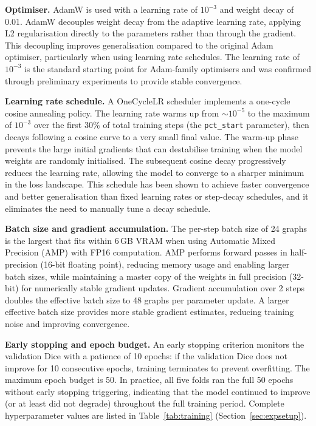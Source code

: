 \documentclass{article}
\begin{document}
\textbf{Optimiser.}
AdamW \cite{loshchilov2019adamw} is used with a learning rate of $10^{-3}$
and weight decay of 0.01. AdamW decouples weight decay from the adaptive
learning rate, applying L2 regularisation directly to the parameters rather
than through the gradient. This decoupling improves generalisation compared
to the original Adam optimiser, particularly when using learning rate
schedules. The learning rate of $10^{-3}$ is the standard starting point for
Adam-family optimisers and was confirmed through preliminary experiments to
provide stable convergence.

\textbf{Learning rate schedule.}
A OneCycleLR scheduler implements a one-cycle cosine annealing policy. The
learning rate warms up from $\sim$$10^{-5}$ to the maximum of $10^{-3}$ over
the first 30\% of total training steps (the \texttt{pct\_start} parameter),
then decays following a cosine curve to a very small final value. The warm-up
phase prevents the large initial gradients that can destabilise training when
the model weights are randomly initialised. The subsequent cosine decay
progressively reduces the learning rate, allowing the model to converge to a
sharper minimum in the loss landscape. This schedule has been shown to achieve
faster convergence and better generalisation than fixed learning rates or
step-decay schedules, and it eliminates the need to manually tune a decay
schedule.

\textbf{Batch size and gradient accumulation.}
The per-step batch size of 24 graphs is the largest that fits within 6\,GB
VRAM when using Automatic Mixed Precision (AMP) with FP16 computation. AMP
performs forward passes in half-precision (16-bit floating point), reducing
memory usage and enabling larger batch sizes, while maintaining a master copy
of the weights in full precision (32-bit) for numerically stable gradient
updates. Gradient accumulation over 2 steps doubles the effective batch size
to 48 graphs per parameter update. A larger effective batch size provides more
stable gradient estimates, reducing training noise and improving convergence.

\textbf{Early stopping and epoch budget.}
An early stopping criterion monitors the validation Dice with a patience of
10 epochs: if the validation Dice does not improve for 10 consecutive epochs,
training terminates to prevent overfitting. The maximum epoch budget is 50.
In practice, all five folds ran the full 50 epochs without early stopping
triggering, indicating that the model continued to improve (or at least did
not degrade) throughout the full training period. Complete hyperparameter
values are listed in Table~\ref{tab:training} (Section~\ref{sec:expsetup}).
\end{document}
